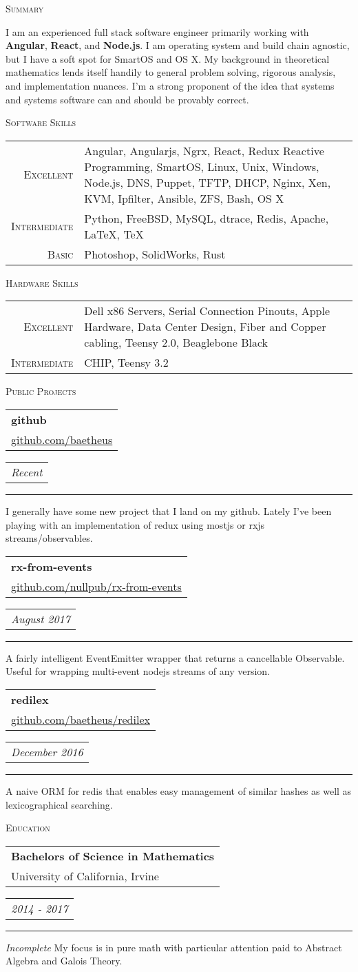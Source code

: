 \documentclass{article}
\makeatletter
\newcommand{\split}[3]{
\noindent\begin{tabular}[t]{@{}l}
    \textbf{#1} \\ #2
\end{tabular}
\hfill
\begin{tabular}[t]{l@{}}
    \\
    \textit{#3}
\end{tabular}
\noindent\rule{\columnwidth}{0.5pt}
}
\newcommand{\sub}[1]{
    {\raggedleft
        \large{\textsc{\color{OliveGreen}#1}}\par
    }
}
\makeatother
\begin{document}
\begin{multicols}{2}
\iffalse

\split{Magenta Computer}{Technician}{Aug 2001 -- Aug 2004}
\textbf{Server manufacturing}, hardware and software \textbf{troubleshooting}, and \textbf{data recovery}. I cut my teeth here on everything from Intel's 486DX2 to the first Xeons and beyond.
\fi

\columnbreak

\sub{Summary}
I am an experienced full stack software engineer primarily working with \textbf{Angular}, \textbf{React}, and \textbf{Node.js}. I am operating system and build chain agnostic, but I have a soft spot for SmartOS and OS X. My background in theoretical mathematics lends itself handily to general problem solving, rigorous analysis, and implementation nuances. I'm a strong proponent of the idea that systems and systems software can and should be provably correct.

\sub{Software Skills}
\begin{tabular}{r|p{61mm}}
\textsc{Excellent} & Angular, Angularjs, Ngrx, React, Redux Reactive Programming, SmartOS, Linux, Unix, Windows, Node.js, DNS, Puppet, TFTP, DHCP, Nginx, Xen, KVM, Ipfilter, Ansible, ZFS, Bash, OS X \\
\textsc{Intermediate} & Python, FreeBSD, MySQL, dtrace, Redis, Apache, \LaTeX, \TeX \\
\textsc{Basic} & Photoshop, SolidWorks, Rust
\end{tabular}

\sub{Hardware Skills}
\begin{tabular}{r|p{61mm}}
\textsc{Excellent} & Dell x86 Servers, Serial Connection Pinouts, Apple Hardware, Data Center Design, Fiber and Copper cabling, Teensy 2.0, Beaglebone Black \\
\textsc{Intermediate} & CHIP, Teensy 3.2
\end{tabular}

\sub{Public Projects}
\split{github}{\href{https://github.com/baetheus}{github.com/baetheus}}{Recent}
I generally have some new project that I land on my github. Lately I've been playing with an implementation of redux using mostjs or rxjs streams/observables.

\split{rx-from-events}{\href{https://github.com/nullpub/rx-from-events}{github.com/nullpub/rx-from-events}}{August 2017}
A fairly intelligent EventEmitter wrapper that returns a cancellable Observable. Useful for wrapping multi-event nodejs streams of any version.

\split{redilex}{\href{https://github.com/baetheus/redilex}{github.com/baetheus/redilex}}{December 2016}
A naive ORM for redis that enables easy management of similar hashes as well as lexicographical searching.

\sub{Education}
\split{Bachelors of Science in Mathematics}{University of California, Irvine}{2014 - 2017}
\textit{Incomplete} My focus is in pure math with particular attention paid to Abstract Algebra and Galois Theory.

\end{multicols}
\end{document}
